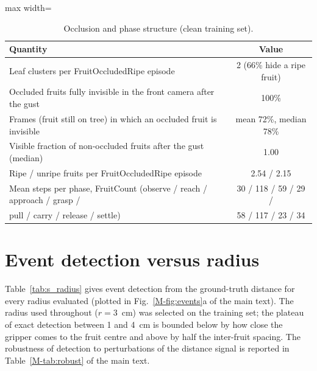 \documentclass[preprint,12pt,authoryear]{elsarticle}
\newcommand{\mref}[1]{\ref*{M-#1}}
\begin{document}
\begin{table}[h]
\centering
\caption{Occlusion and phase structure (clean training set).}
\label{tab:s_occlusion}
\small
\begin{adjustbox}{max width=\textwidth}\begin{tabular}{lc}
\toprule
Quantity & Value\\
\midrule
Leaf clusters per FruitOccludedRipe episode & 2 (66\% hide a ripe fruit)\\
Occluded fruits fully invisible in the front camera after the gust & 100\%\\
Frames (fruit still on tree) in which an occluded fruit is invisible & mean 72\%, median 78\%\\
Visible fraction of non-occluded fruits after the gust (median) & 1.00\\
Ripe / unripe fruits per FruitOccludedRipe episode & 2.54 / 2.15\\
Mean steps per phase, FruitCount (observe / reach / approach / grasp / & 30 / 118 / 59 / 29 /\\
\quad pull / carry / release / settle) & 58 / 117 / 23 / 34\\
\bottomrule
\end{tabular}\end{adjustbox}
\end{table}

\section{Event detection versus radius}
\label{sec:s_events}
Table~\ref{tab:s_radius} gives event detection from the ground-truth distance for every radius evaluated (plotted in Fig.~\mref{fig:events}a of the main text). The radius used throughout ($r=3$~cm) was selected on the training set; the plateau of exact detection between 1 and 4~cm is bounded below by how close the gripper comes to the fruit centre and above by half the inter-fruit spacing. The robustness of detection to perturbations of the distance signal is reported in Table~\mref{tab:robust} of the main text.
\end{document}
